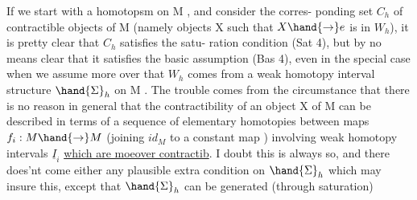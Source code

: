 If we start with a homotopsm   on M , and consider the corres-%
ponding set $C_h$ of contractible  objects of M (namely objects X
such that $X \hand{\to} e$ is in $W_h$), it is pretty clear that $C_h$ satisfies the satu-%
ration condition (Sat 4), but by no means clear that it satisfies the
basic assumption (Bas 4), even in the special case when we assume more%
over that $W_h$ comes from a weak homotopy interval structure $\hand{\Sigma}_h$ on M .
The trouble comes from the circumstance that there is no reason in general
that the contractibility of an object X of M can be described in terms of
 a sequence of elementary homotopies between maps $f_i : M \hand{\to} M$
(joining $id_M$ to a constant map ) involving weak homotopy intervals $\underline{I}_i$
\uline{which are moeover contractib}.  I doubt this is always so, and
there does'nt come either any plausible extra condition on $\hand{\Sigma}_h$ which may
insure this, except  that $\hand{\Sigma}_h$ can be generated (through saturation)


